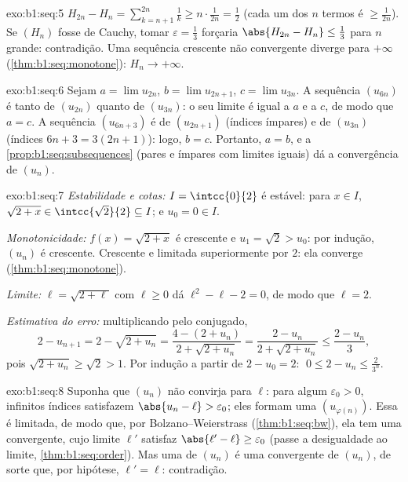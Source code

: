 \begin{solution}{exo:b1:seq:5}
$H_{2n} - H_n = \sum_{k=n+1}^{2n} \frac 1k \geq n \cdot
\frac{1}{2n} = \frac12$ (cada um dos $n$ termos é $\geq
\frac{1}{2n}$). Se $(H_n)$ fosse de Cauchy, tomar $\varepsilon =
\frac13$ forçaria $\abs{H_{2n} - H_n} \leq \frac13$ para $n$
grande: contradição. Uma sequência crescente não convergente diverge
para $+\infty$ (\cref{thm:b1:seq:monotone}): $H_n \to +\infty$.
\end{solution}

\begin{solution}{exo:b1:seq:6}
Sejam $a = \lim u_{2n}$, $b = \lim u_{2n+1}$, $c = \lim u_{3n}$. A
sequência $(u_{6n})$ é  tanto de $(u_{2n})$ quanto de
$(u_{3n})$: o seu limite é igual a $a$ e a $c$, de modo que $a = c$. A
sequência $(u_{6n+3})$ é  de $(u_{2n+1})$ (índices ímpares) e
de $(u_{3n})$ (índices $6n + 3 = 3(2n+1)$): logo, $b = c$. Portanto, $a = b$, e
a \cref{prop:b1:seq:subsequences} (pares e ímpares com limites iguais)
dá a convergência de $(u_n)$.
\end{solution}

\begin{solution}{exo:b1:seq:7}
\emph{Estabilidade e cotas:} $I = \intcc{0}{2}$ é estável: para $x \in
I$, $\sqrt{2 + x} \in \intcc{\sqrt 2}{2} \subseteq I$; e $u_0 = 0
\in I$.

\emph{Monotonicidade:} $f(x) = \sqrt{2+x}$ é crescente e $u_1 =
\sqrt 2 > u_0$: por indução, $(u_n)$ é crescente. Crescente e
limitada superiormente por $2$: ela converge
(\cref{thm:b1:seq:monotone}).

\emph{Limite:} $\ell = \sqrt{2 + \ell}$ com $\ell \geq 0$ dá
$\ell^2 - \ell - 2 = 0$, de modo que $\ell = 2$.

\emph{Estimativa do erro:} multiplicando pelo conjugado,
\[
2 - u_{n+1} = 2 - \sqrt{2 + u_n}
= \frac{4 - (2 + u_n)}{2 + \sqrt{2+u_n}}
= \frac{2 - u_n}{2 + \sqrt{2 + u_n}}
\leq \frac{2 - u_n}{3},
\]
pois $\sqrt{2 + u_n} \geq \sqrt 2 > 1$. Por indução a partir de $2 - u_0
= 2$: $\;0 \leq 2 - u_n \leq \frac{2}{3^n}$.
\end{solution}

\begin{solution}{exo:b1:seq:8}
Suponha que $(u_n)$ não convirja para $\ell$: para algum $\varepsilon_0
> 0$, infinitos índices satisfazem $\abs{u_n - \ell} >
\varepsilon_0$; eles formam uma  $(u_{\varphi(n)})$. Essa
 é limitada, de modo que, por Bolzano--Weierstrass
(\cref{thm:b1:seq:bw}), ela tem uma  convergente, cujo
limite $\ell'$ satisfaz $\abs{\ell' - \ell} \geq \varepsilon_0$
(passe a desigualdade ao limite, \cref{thm:b1:seq:order}). Mas uma
 de $(u_n)$ é uma  convergente de $(u_n)$,
de sorte que, por hipótese, $\ell' = \ell$: contradição.
\end{solution}

